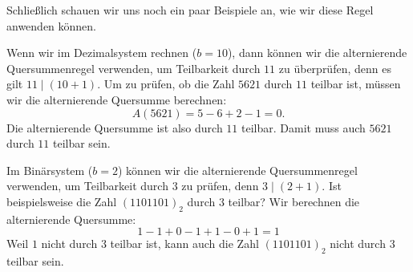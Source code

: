 \documentclass[../../main.tex]{subfiles}
\begin{document}
Schließlich schauen wir uns noch ein paar Beispiele an, wie wir diese Regel anwenden können.
\begin{example}{}
    Wenn wir im Dezimalsystem rechnen ($b=10$), dann können wir die alternierende Quersummenregel verwenden, um Teilbarkeit durch $11$ zu überprüfen, denn es gilt $11\mid(10+1)$. Um zu prüfen, ob die Zahl $5621$ durch $11$ teilbar ist, müssen wir die alternierende Quersumme berechnen:
    \[A(5621)=5-6+2-1=0.\]
    Die alternierende Quersumme ist also durch $11$ teilbar. Damit muss auch $5621$ durch $11$ teilbar sein.
\end{example}
\begin{example}{}
    Im Binärsystem ($b=2$) können wir die alternierende Quersummenregel verwenden, um Teilbarkeit durch $3$ zu prüfen, denn $3\mid(2+1)$. Ist beispielsweise die Zahl $(1101101)_2$ durch $3$ teilbar? Wir berechnen die alternierende Quersumme:
    \[1-1+0-1+1-0+1=1\]
    Weil $1$ nicht durch $3$ teilbar ist, kann auch die Zahl $(1101101)_2$ nicht durch $3$ teilbar sein.
\end{example}

\newpage
\pagecolor{white}
\end{document}

